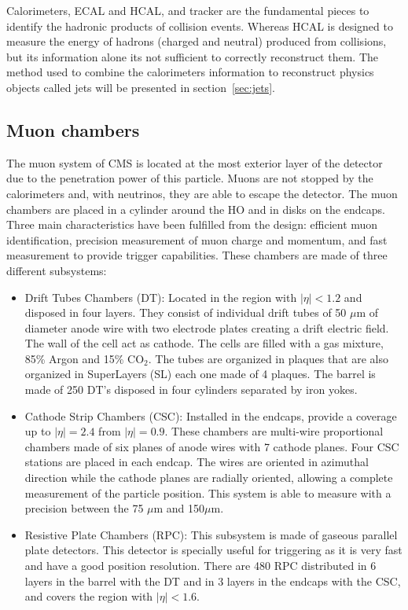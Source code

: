 Calorimeters, ECAL and HCAL, and tracker are the fundamental pieces to identify the hadronic products of collision events. Whereas HCAL is designed to measure the energy of hadrons (charged and neutral) produced from collisions, but its information alone its not sufficient to correctly reconstruct them. The method used to combine the calorimeters information to reconstruct physics objects called jets will be presented in section~\ref{sec:jets}.

\subsection{Muon chambers}
\label{sec:muons}

The muon system of CMS is located at the most exterior layer of the detector  due to the penetration power of this particle. Muons are not stopped by the calorimeters and, with neutrinos, they are able to escape the detector. The muon chambers are placed in a cylinder around the HO and in disks on the endcaps. Three main characteristics have been fulfilled from the design: efficient muon identification, precision measurement of muon charge and momentum, and fast measurement to provide trigger capabilities. These chambers are made of three different subsystems:
\begin{itemize}
\item Drift Tubes Chambers (DT): Located in the region with $|\eta|<1.2$ and disposed in four layers. They consist of individual drift tubes of 50 $\mu$m of diameter anode wire with two electrode plates creating a drift electric field. The wall of the cell act as cathode. The cells are filled with a gas mixture, 85\% Argon and 15\% $\text{CO}_{2}$. The tubes are organized in plaques that are also organized in SuperLayers (SL) each one made of 4 plaques. The barrel is made of 250 DT's disposed in four cylinders separated by iron yokes. 
\item Cathode Strip Chambers (CSC): Installed in the endcaps, provide a coverage up to $|\eta|=2.4$ from $|\eta|=0.9$. These chambers are multi-wire proportional chambers made of six planes of anode wires with 7 cathode planes. Four CSC stations are placed in each endcap. The wires are oriented in azimuthal direction while the cathode planes are radially oriented, allowing a complete measurement of the particle position. This system is able to measure with a precision between the 75 $\mu$m and 150$\mu$m.
\item Resistive Plate Chambers (RPC): This subsystem is made of gaseous parallel plate detectors. This detector is specially useful for triggering as it is very fast and have a good position resolution. There are 480 RPC distributed in 6 layers in the barrel with the DT and in 3 layers in the endcaps with the CSC, and covers the region with $|\eta|<1.6$. 
\end{itemize}

